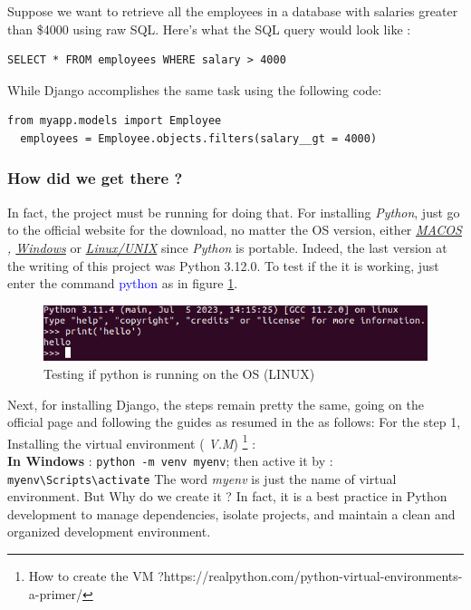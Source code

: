 \documentclass[12pt,a4paper, oneside]{book}
\begin{document}
	Suppose we want to retrieve all the employees in a database with salaries greater than \$4000 using raw SQL. Here's what the SQL query would look like : 	
\begin{lstlisting}[style=htmlcssjsstyle]
 SELECT * FROM employees WHERE salary > 4000
\end{lstlisting}
  While Django accomplishes the same task using the following code:
\begin{lstlisting}[style=stylejupyter]
from myapp.models import Employee
  employees = Employee.objects.filters(salary__gt = 4000)
\end{lstlisting}
    \subsubsection*{How did we get there ?}
   In fact, the project must be running for doing that. For installing \textit{Python}, just go to the official website for the  download, no matter the OS version, either \textit{ \href{https://www.python.org/downloads/macos/}{MACOS} , \href{https://www.python.org/downloads/windows/}{Windows} } or \href{https://www.python.org/downloads/source/}{\textit{Linux/UNIX}} since \textit{Python} is portable. Indeed, the last version at the writing of this project was Python 3.12.0. To test if the it is working, just enter the command \textcolor{blue}{python} as in figure \ref{fig:testpython}.
   \begin{figure}
   	\centering
   	\includegraphics[width=1\linewidth]{testPython}
   	\caption{Testing if python is running on the OS (LINUX)}
   	\label{fig:testpython}
   \end{figure}
   
   
   Next, for installing Django, the steps remain pretty the same, going on the official page and following the guides as resumed in the as follows:   
   For the step 1, Installing the virtual environment ( \textit{V.M}) \footnote{How to create the VM ?https://realpython.com/python-virtual-environments-a-primer/}    : \\
   
   \textbf{In Windows} : \texttt{python -m venv myenv}; then active it by : \texttt{myenv\textbackslash Scripts\textbackslash activate} \newline
   The word \textit{myenv} is just the name of virtual environment. But Why do we create it ? In fact, it is a best practice in Python development to manage dependencies, isolate projects, and maintain a clean and organized development environment. \\
    
\end{document}
